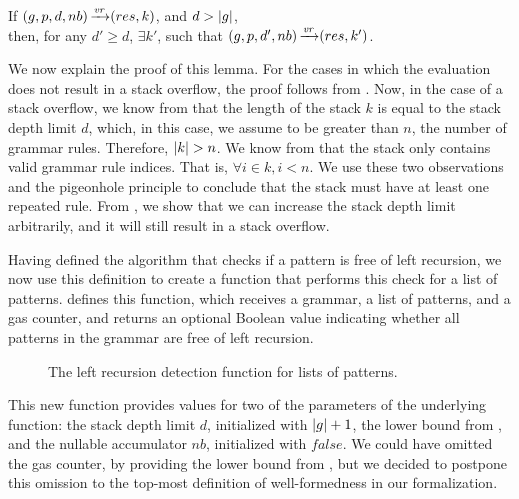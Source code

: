 \begin{lemma}%
    If $(g,p,d,nb) \operatorname{\xrightarrow{\mathit{vr}}} (res,k)$, and $d > |g|$, \\
    then, for any $d' \ge d$,
    $\exists k'$,
    such that $(g,p,d',nb) \operatorname{\xrightarrow{\mathit{vr}}} (res,k')$.
    \label{lemma:stack-depth-convergence}
\end{lemma}

We now explain the proof of this lemma.
For the cases in which the evaluation
does not result in a stack overflow,
the proof follows from .
Now, in the case of a stack overflow,
we know from 
that the length of the stack $k$ is equal to the stack depth limit $d$,
which, in this case, we assume to be greater than $n$, the number of grammar rules.
Therefore, $|k| > n$.
We know from 
that the stack only contains valid grammar rule indices.
That is, $\forall i \in k, i < n$.
We use these two observations and the pigeonhole principle to conclude
that the stack must have at least one repeated rule.
From ,
we show that we can increase the stack depth limit arbitrarily,
and it will still result in a stack overflow.

Having defined the algorithm
that checks if a pattern is free of left recursion,
we now use this definition to create a function
that performs this check for a list of patterns.
 defines this function,
which receives a grammar, a list of patterns,
and a gas counter,
and returns an optional Boolean value
indicating whether all patterns in the grammar
are free of left recursion.

\begin{figure}
    \centering
    
    \caption{The left recursion detection function for lists of patterns.}
    \label{fig:lverifyrule-function}
\end{figure}

This new function provides values
for two of the parameters of the underlying function:
the stack depth limit $d$, initialized with $|g|+1$,
the lower bound from ,
and the nullable accumulator $nb$, initialized with $false$.
We could have omitted the gas counter,
by providing the lower bound from ,
but we decided to postpone
this omission to the top-most definition
of well-formedness in our formalization.

